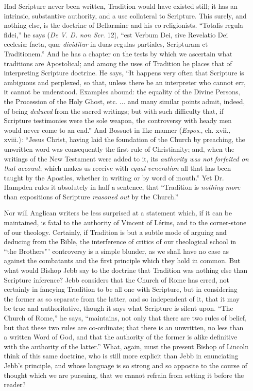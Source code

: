 Had Scripture never been written, Tradition would
have existed still; it has an intrinsic, substantive authority, and a
use collateral to Scripture. This surely, and nothing else, is the
doctrine of Bellarmine and his co-religionists. ``Totalis regula fidei,''
he says (\emph{De V. D. non Scr}. 12), ``est Verbum Dei, sive Revelatio
Dei ecclesiæ facta, quæ \emph{dividitur} in duas regulas partiales,
Scripturam et Traditionem.'' And he has a chapter on the tests by which
we ascertain what traditions are Apostolical; and among the uses of
Tradition he places that of interpreting Scripture doctrine. He says, ``It
happens very often that Scripture is ambiguous and perplexed, so that,
unless there be an interpreter who cannot err, it cannot be
understood. Examples abound: the equality of the Divine Persons, the
Procession of the Holy Ghost, etc. ... and many similar points admit,
indeed, of being \emph{deduced} from the sacred writings; but with
such difficulty that, if Scripture testimonies were the sole weapon,
the controversy with heady men would never come to an end.'' And
Bossuet in like manner (\emph{Expos}., ch. xvii., xviii.): ``Jesus
Christ, having laid the foundation of the Church by preaching, the
unwritten word was consequently the first rule of Christianity; and,
when the writings of the New Testament were added to it, its \emph{authority
was not forfeited on that account}; which makes us receive with \emph{equal
veneration} all that has been taught by the Apostles, whether
in writing or by word of mouth.'' Yet Dr. Hampden rules it absolutely
in half a sentence, that ``Tradition is \emph{nothing more} than
expositions of Scripture \emph{reasoned out} by the Church.''

Nor will Anglican writers be less surprised at a
statement which, if it can be maintained, is fatal to the authority of
Vincent of Lérins, and to the corner-stone of our theology.
Certainly, if Tradition is but a subtle mode of arguing and deducing
from the Bible, the interference of critics of our theological school
in ``the Brothers''' controversy is a simple blunder, as we shall have
no case as against the combatants and the first principle which they
hold in common. But what would Bishop Jebb say to the doctrine that
Tradition was nothing else than Scripture inference? Jebb considers
that the Church of Rome has erred, not certainly in fancying Tradition
to be all one with Scripture, but in considering the former as so
separate from the latter, and so independent of it, that it may be
true and authoritative, though it says what Scripture is silent upon. ``The
Church of Rome,'' he says, ``maintains, not only that there are two
rules of belief, but that these two rules are co-ordinate; that there
is an unwritten, no less than a written Word of God, and that the
authority of the former is alike definitive with the authority of the
latter.'' What, again, must the present Bishop of Lincoln think of this
same doctrine, who is still more explicit than Jebb in enunciating
Jebb's principle, and whose language is so strong and so apposite to
the course of thought which we are pursuing, that we cannot refrain
from setting it before the reader?

